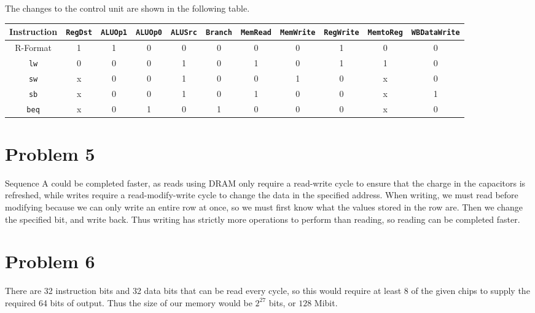 \documentclass[12pt]{article}
\begin{document}
The changes to the control unit are shown in the following table.
\begin{center}
       {\scriptsize
        \hspace*{-4cm}
        \begin{tabular}{c|c|c|c|c|c|c|c|c|c|c}
                Instruction & \texttt{RegDst} & \texttt{ALUOp1} & \texttt{ALUOp0} & \texttt{ALUSrc} & \texttt{Branch} & \texttt{MemRead}
                & \texttt{MemWrite} & \texttt{RegWrite} & \texttt{MemtoReg} & \texttt{WBDataWrite}\\
                \hline
                R-Format & 1 & 1 & 0 & 0 & 0 & 0 & 0 & 1 & 0 & 0\\
                \texttt{lw} & 0 & 0 & 0 & 1 & 0 & 1 & 0 & 1 & 1 & 0\\
                \texttt{sw} & x & 0 & 0 & 1 & 0 & 0 & 1 & 0 & x & 0\\
                \texttt{sb} & x & 0 & 0 & 1 & 0 & 1 & 0 & 0 & x & 1\\
                \texttt{beq} & x & 0 & 1 & 0 & 1 & 0 & 0 & 0 & x & 0
        \end{tabular}
        \hspace{-4cm}
        }
\end{center}

\section*{Problem 5}

Sequence A could be completed faster, as reads using DRAM only require a read-write cycle to ensure that the charge in the capacitors is refreshed,
while writes require a read-modify-write cycle to change the data in the specified address. When writing, we must read before modifying because we can only write
an entire row at once, so we must first know what the values stored in the row are. Then we change the specified bit, and write back. Thus writing has strictly more
operations to perform than reading, so reading can be completed faster.

\section*{Problem 6}

There are 32 instruction bits and 32 data bits that can be read every cycle, so this would require at least 8 of the given chips to supply the required 64 bits
of output. Thus the size of our memory would be \(2^{27}\) bits, or \(128\) Mibit.
\end{document}
